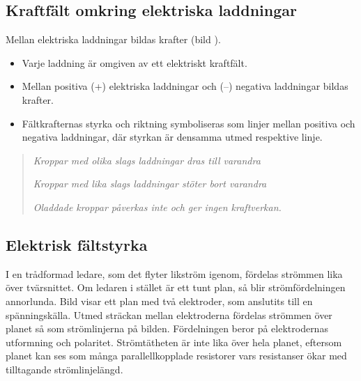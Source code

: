 \newpage
{}


\subsection{Kraftfält omkring elektriska laddningar}


\noindent
Mellan elektriska laddningar bildas krafter (bild ).

\begin{itemize}
  \item Varje laddning är omgiven av ett elektriskt kraftfält.
  \item Mellan positiva (+) elektriska laddningar och (--) negativa laddningar
  bildas krafter.
  \item Fältkrafternas styrka och riktning symboliseras som linjer mellan
  positiva och negativa laddningar, där styrkan är densamma utmed respektive
  linje.
\end{itemize}


\begin{quote}
\emph{Kroppar med olika slags laddningar dras till varandra}

\emph{Kroppar med lika slags laddningar stöter bort varandra}

\emph{Oladdade kroppar påverkas inte och ger ingen kraftverkan.}
\end{quote}

\subsection{Elektrisk fältstyrka}
\label{elektrisk_fälststyrka}


I en trådformad ledare, som det flyter likström igenom, fördelas strömmen lika
över tvärsnittet.
Om ledaren i stället är ett tunt plan, så blir strömfördelningen annorlunda.
Bild  visar ett plan med två elektroder, som anslutits till en spänningskälla.
Utmed sträckan mellan elektroderna fördelas strömmen över planet så som
strömlinjerna på bilden.
Fördelningen beror på elektrodernas utformning och polaritet.
Strömtätheten är inte lika över hela planet, eftersom planet kan ses som många
parallellkopplade resistorer vars resistanser ökar med tilltagande
strömlinjelängd.

